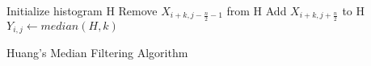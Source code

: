 \begin{algorithm}[H]
    Initialize histogram H\;
    {
        {
            {
                Remove $X_{i+k,j-\frac{n}{2}-1}$  from H\;
                Add $X_{i+k,j+\frac{n}{2}}$ to H\; 
            }
            $Y_{i,j} \leftarrow median(H,k)$\;
        }
    }
\caption{Huang's Median Filtering Algorithm \cite{median_filter_old}}
\label{algorithm:median_filter}
\end{algorithm}